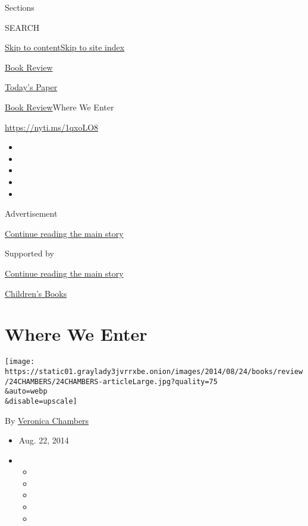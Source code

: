 Sections

SEARCH

\protect\hyperlink{site-content}{Skip to
content}\protect\hyperlink{site-index}{Skip to site index}

\href{https://www.nytimes3xbfgragh.onion/section/books/review}{Book
Review}

\href{https://myaccount.nytimes3xbfgragh.onion/auth/login?response_type=cookie\&client_id=vi}{}

\href{https://www.nytimes3xbfgragh.onion/section/todayspaper}{Today's
Paper}

\href{/section/books/review}{Book Review}\textbar{}Where We Enter

\url{https://nyti.ms/1qxoLO8}

\begin{itemize}
\item
\item
\item
\item
\item
\end{itemize}

Advertisement

\protect\hyperlink{after-top}{Continue reading the main story}

Supported by

\protect\hyperlink{after-sponsor}{Continue reading the main story}

\href{/column/childrens-books}{Children's Books}

\hypertarget{where-we-enter}{%
\section{Where We Enter}\label{where-we-enter}}

\texttt{[image: https://static01.graylady3jvrrxbe.onion/images/2014/08/24/books/review/24CHAMBERS/24CHAMBERS-articleLarge.jpg?quality=75\\\&auto=webp\\\&disable=upscale]}

By
\href{https://www.nytimes3xbfgragh.onion/by/veronica-chambers}{Veronica
Chambers}

\begin{itemize}
\item
  Aug. 22, 2014
\item
  \begin{itemize}
  \item
  \item
  \item
  \item
  \item
  \end{itemize}
\end{itemize}


